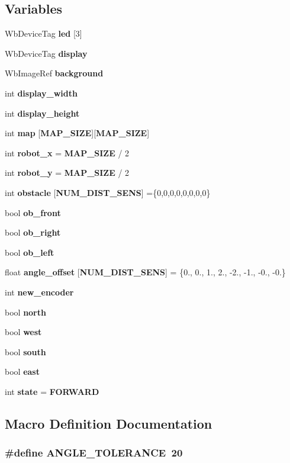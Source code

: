 \subsection*{Variables}
\begin{DoxyCompactItemize}
\item 
Wb\-Device\-Tag {\bf led} [3]
\item 
Wb\-Device\-Tag {\bf display}
\item 
Wb\-Image\-Ref {\bf background}
\item 
int {\bf display\-\_\-width}
\item 
int {\bf display\-\_\-height}
\item 
int {\bf map} [{\bf M\-A\-P\-\_\-\-S\-I\-Z\-E}][{\bf M\-A\-P\-\_\-\-S\-I\-Z\-E}]
\item 
int {\bf robot\-\_\-x} = {\bf M\-A\-P\-\_\-\-S\-I\-Z\-E} / 2
\item 
int {\bf robot\-\_\-y} = {\bf M\-A\-P\-\_\-\-S\-I\-Z\-E} / 2
\item 
int {\bf obstacle} [{\bf N\-U\-M\-\_\-\-D\-I\-S\-T\-\_\-\-S\-E\-N\-S}] =\{0,0,0,0,0,0,0,0\}
\item 
bool {\bf ob\-\_\-front}
\item 
bool {\bf ob\-\_\-right}
\item 
bool {\bf ob\-\_\-left}
\item 
float {\bf angle\-\_\-offset} [{\bf N\-U\-M\-\_\-\-D\-I\-S\-T\-\_\-\-S\-E\-N\-S}] = \{0., 0., 1., 2., -\/2., -\/1., -\/0., -\/0.\}
\item 
int {\bf new\-\_\-encoder}
\item 
bool {\bf north}
\item 
bool {\bf west}
\item 
bool {\bf south}
\item 
bool {\bf east}
\item 
int {\bf state} = {\bf F\-O\-R\-W\-A\-R\-D}
\end{DoxyCompactItemize}


\subsection{Macro Definition Documentation}
\subsubsection[{A\-N\-G\-L\-E\-\_\-\-T\-O\-L\-E\-R\-A\-N\-C\-E}]{\setlength{\rightskip}{0pt plus 5cm}\#define A\-N\-G\-L\-E\-\_\-\-T\-O\-L\-E\-R\-A\-N\-C\-E~20}\label{lib_2map__building_8c_a5835d2253221816d4f18e65f9796d3c6}
